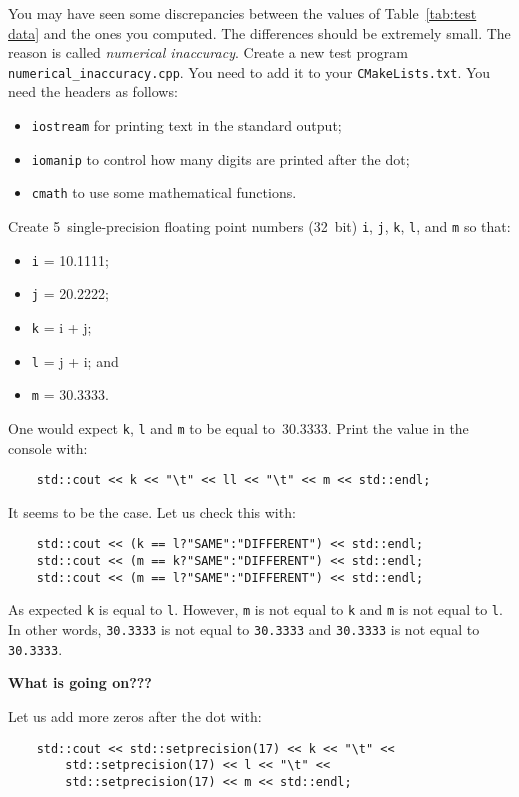 \documentclass[english,a4paper,12pt,oneside]{article}
\begin{document}
You may have seen some discrepancies between the values of Table~\ref{tab:test data} and the ones you computed. 
The differences should be extremely small. 
The reason is called \emph{numerical inaccuracy}. 
Create a new test program \verb+numerical_inaccuracy.cpp+. You need to add it to your \verb+CMakeLists.txt+. 
You need the headers as follows:
\begin{itemize}
 \item \verb+iostream+ for printing text in the standard output;
 \item \verb+iomanip+ to control how many digits are printed after the dot;
 \item \verb+cmath+ to use some mathematical functions.
\end{itemize}
Create 5~single-precision floating point numbers (32~bit) \verb+i+, \verb+j+, \verb+k+, \verb+l+, and \verb+m+ so that:
\begin{itemize}
	\item \verb+i+ = 10.1111;
	\item \verb+j+ = 20.2222;
	\item \verb+k+ = i + j;
	\item \verb+l+ = j + i; and
	\item \verb+m+ = 30.3333.
\end{itemize}
One would expect \verb+k+, \verb+l+ and \verb+m+ to be equal to~30.3333. 
Print the value in the console with:
\begin{lstlisting}
    std::cout << k << "\t" << ll << "\t" << m << std::endl;
\end{lstlisting}
It seems to be the case. 
Let us check this with:
\begin{lstlisting}
    std::cout << (k == l?"SAME":"DIFFERENT") << std::endl;
    std::cout << (m == k?"SAME":"DIFFERENT") << std::endl;
    std::cout << (m == l?"SAME":"DIFFERENT") << std::endl;
\end{lstlisting}
As expected \verb+k+ is equal to \verb+l+. 
However, \verb+m+ is not equal to \verb+k+ and \verb+m+ is not equal to \verb+l+. 
In other words, \verb+30.3333+ is not equal to \verb+30.3333+ and \verb+30.3333+ is not equal to \verb+30.3333+. 

\begin{center}{\bf What is going on???}\end{center}

Let us add more zeros after the dot with:
\begin{lstlisting}
    std::cout << std::setprecision(17) << k << "\t" <<
        std::setprecision(17) << l << "\t" <<
        std::setprecision(17) << m << std::endl;
\end{lstlisting}
\end{document}
